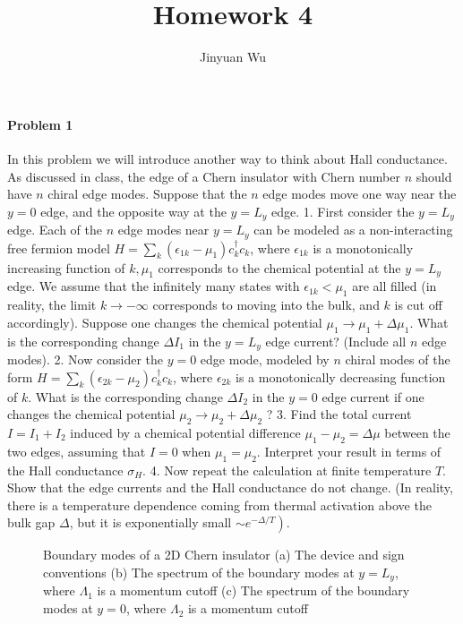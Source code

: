 \documentclass[hyperref, a4paper]{article}
\title{Homework 4}
\author{Jinyuan Wu}
\begin{document}
\maketitle

\paragraph{Problem 1} In this problem we will introduce another way to think about Hall conductance. As discussed in class, the edge of a Chern insulator with Chern number $n$ should have $n$ chiral edge modes. Suppose that the $n$ edge modes move one way near the $y=0$ edge, and the opposite way at the $y=L_y$ edge.
1. First consider the $y=L_y$ edge. Each of the $n$ edge modes near $y=L_y$ can be modeled as a non-interacting free fermion model $H=\sum_k\left(\epsilon_{1 k}-\mu_1\right) c_k^{\dagger} c_k$, where $\epsilon_{1 k}$ is a monotonically increasing function of $k, \mu_1$ corresponds to the chemical potential at the $y=L_y$ edge. We assume that the infinitely many states with $\epsilon_{1 k}<\mu_1$ are all filled (in reality, the limit $k \rightarrow-\infty$ corresponds to moving into the bulk, and $k$ is cut off accordingly). Suppose one changes the chemical potential $\mu_1 \rightarrow \mu_1+\Delta \mu_1$. What is the corresponding change $\Delta I_1$ in the $y=L_y$ edge current? (Include all $n$ edge modes).
2. Now consider the $y=0$ edge mode, modeled by $n$ chiral modes of the form $H=\sum_k\left(\epsilon_{2 k}-\mu_2\right) c_k^{\dagger} c_k$, where $\epsilon_{2 k}$ is a monotonically decreasing function of $k$. What is the corresponding change $\Delta I_2$ in the $y=0$ edge current if one changes the chemical potential $\mu_2 \rightarrow \mu_2+\Delta \mu_2$ ?
3. Find the total current $I=I_1+I_2$ induced by a chemical potential difference $\mu_1-\mu_2=\Delta \mu$ between the two edges, assuming that $I=0$ when $\mu_1=\mu_2$. Interpret your result in terms of the Hall conductance $\sigma_H$.
4. Now repeat the calculation at finite temperature $T$. Show that the edge currents and the Hall conductance do not change. (In reality, there is a temperature dependence coming from thermal activation above the bulk gap $\Delta$, but it is exponentially small $\left.\sim e^{-\Delta / T}\right)$.

\begin{figure}
    \centering
    
    \caption{Boundary modes of a 2D Chern insulator 
    (a) The device and sign conventions
    (b) The spectrum of the boundary modes at $y = L_y$, where $\Lambda_1$ is a momentum cutoff 
    (c) The spectrum of the boundary modes at $y = 0$, where $\Lambda_2$ is a momentum cutoff}
    \label{fig:chern-boundary}
\end{figure}
\end{document}
